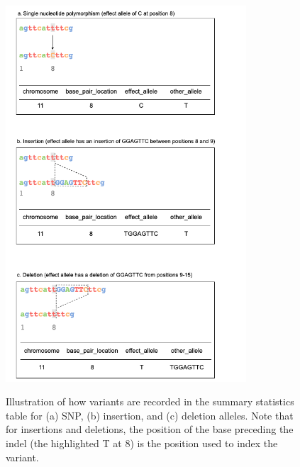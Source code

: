 \documentclass[11pt]{article}
\begin{document}
\begin{figure}[h]
 \centering
 \caption{Illustration of how variants are recorded in the summary statistics table for (a) SNP, (b) insertion, and (c) deletion alleles. Note that for insertions and deletions, the position of the base preceding the indel (the highlighted T at 8) is the position used to index the variant.}
 \includegraphics[width=0.8\textwidth]{variant_rep}
 \label{fig:variant_rep}
\end{figure}




\end{document}
